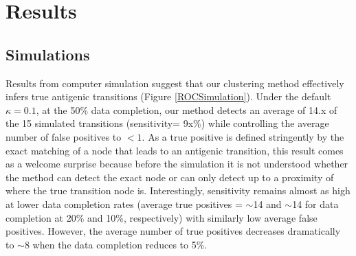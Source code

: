 \documentclass[11pt,oneside,letterpaper]{article}
\begin{document}
\newpage







\newpage

\section*{Results}

\subsection*{Simulations}
Results from computer simulation suggest that our clustering method effectively infers true antigenic transitions (Figure \ref{ROCSimulation}). 
Under the default $\kappa=0.1$, at the 50\% data completion, our method detects an average of 14.x of the 15 simulated transitions (sensitivity= 9x\%) while controlling the average number of false positives to $<1$. 
As a true positive is defined stringently by the exact matching of a node that leads to an antigenic transition, this result comes as a welcome surprise because before the simulation it is not understood whether the method can detect the exact node or can only detect up to a proximity of where the true transition node is.
Interestingly, sensitivity remains almost as high at lower data completion rates (average true positives = $\sim$14 and $\sim$14 for data completion at 20\% and 10\%, respectively) with similarly low average false positives. 
However, the average number of true positives decreases dramatically to $\sim$8 when the data completion reduces to 5\%. 
\end{document}
